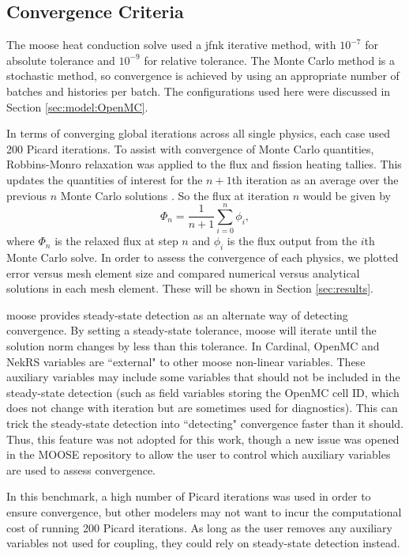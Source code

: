 \documentclass[letterpaper]{mc2023}
\begin{document}
\subsection{Convergence Criteria}
The \gls{moose} heat conduction solve used a \gls{jfnk} iterative method, with $10^{-7}$ for absolute tolerance and $10^{-9}$ for
relative tolerance. The Monte Carlo method is a stochastic method, so convergence is achieved by using an appropriate number of
batches and histories per batch. The configurations used here were discussed in Section \ref{sec:model:OpenMC}.

In terms of converging global iterations across all single physics, each case used 200 Picard iterations. To assist with
convergence of Monte Carlo quantities, Robbins-Monro relaxation was applied to the flux and fission heating tallies. This updates the
quantities of interest for the $n+1$th iteration as an average over the previous $n$ Monte Carlo solutions \cite{dufek}.
So the flux at iteration $n$ would be given by
\begin{equation}\label{eq:Robbins-Monro}
    \Phi_{n} = \frac{1}{n+1} \sum_{i=0}^{n} \phi_{i},
\end{equation}
where $\Phi_{n}$ is the relaxed flux at step $n$ and $\phi_{i}$ is the flux output from the $i$th Monte Carlo solve. In order to assess
the convergence of each physics, we plotted error versus mesh element size and compared numerical versus analytical solutions in each
mesh element. These will be shown in Section \ref{sec:results}.

\gls{moose} provides steady-state detection as an alternate way of detecting convergence. By setting a steady-state tolerance, \gls{moose}
will iterate until the solution norm changes by less than this tolerance. In Cardinal, OpenMC and NekRS variables are ``external" to other
\gls{moose} non-linear variables. These auxiliary variables may include some variables that should not be included in the steady-state
detection (such as field variables storing the OpenMC cell ID, which does not change with iteration but are sometimes used for diagnostics).
This can trick the steady-state detection into ``detecting" convergence faster than it should. Thus, this feature was not adopted for
this work, though a new issue was opened in the MOOSE repository to allow the user to control which auxiliary variables are used to
assess convergence.

In this benchmark, a high number of Picard iterations was used in order to ensure convergence, but other modelers may not want to incur
the computational cost of running 200 Picard iterations. As long as the user removes any auxiliary variables not used for coupling, they
could rely on steady-state detection instead.
\end{document}

